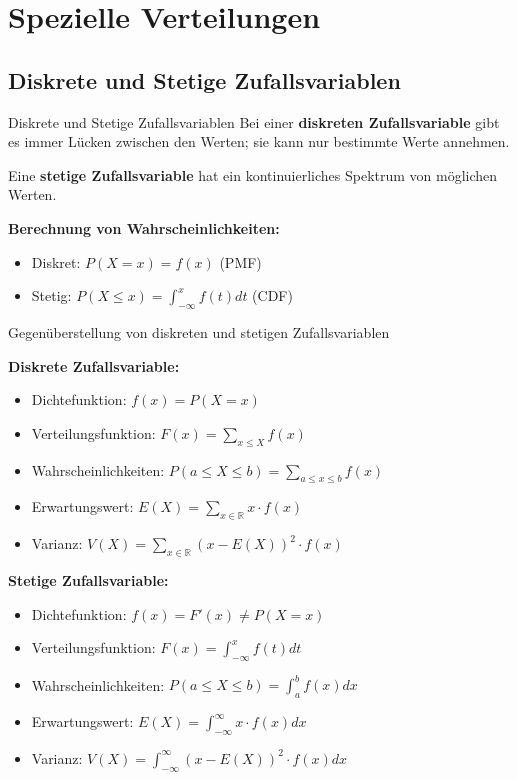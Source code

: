 \section{Spezielle Verteilungen} 

\subsection{Diskrete und Stetige Zufallsvariablen}

\begin{definition}{Diskrete und Stetige Zufallsvariablen}
Bei einer \textbf{diskreten Zufallsvariable} gibt es immer Lücken zwischen den Werten; sie kann nur bestimmte Werte annehmen.

Eine \textbf{stetige Zufallsvariable} hat ein kontinuierliches Spektrum von möglichen Werten.

\textbf{Berechnung von Wahrscheinlichkeiten:}
\begin{itemize}
    \item Diskret: $P(X=x) = f(x)$ (PMF)
    \item Stetig: $P(X \leq x) = \int_{-\infty}^x f(t)dt$ (CDF)
\end{itemize}
\end{definition}

\begin{concept}{Gegenüberstellung von diskreten und stetigen Zufallsvariablen}

\textbf{Diskrete Zufallsvariable:}
\begin{itemize}
    \item Dichtefunktion: $f(x) = P(X=x)$
    \item Verteilungsfunktion: $F(x) = \sum_{x \leq X} f(x)$
    \item Wahrscheinlichkeiten: $P(a \leq X \leq b) = \sum_{a \leq x \leq b} f(x)$
    \item Erwartungswert: $E(X) = \sum_{x \in \mathbb{R}} x \cdot f(x)$
    \item Varianz: $V(X) = \sum_{x \in \mathbb{R}} (x-E(X))^2 \cdot f(x)$
\end{itemize}

\textbf{Stetige Zufallsvariable:}
\begin{itemize}
    \item Dichtefunktion: $f(x) = F'(x) \neq P(X=x)$
    \item Verteilungsfunktion: $F(x) = \int_{-\infty}^x f(t)dt$
    \item Wahrscheinlichkeiten: $P(a \leq X \leq b) = \int_a^b f(x)dx$
    \item Erwartungswert: $E(X) = \int_{-\infty}^{\infty} x \cdot f(x)dx$
    \item Varianz: $V(X) = \int_{-\infty}^{\infty} (x-E(X))^2 \cdot f(x)dx$
\end{itemize}
\end{concept}

